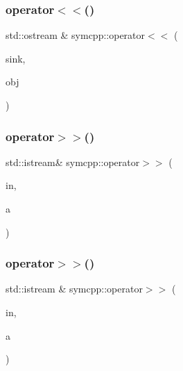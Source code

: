\mbox{\label{namespacesymcpp_a7ad455b0637c10962ac159edf36b2754}} 
\subsubsection{\texorpdfstring{operator$<$$<$()}{operator<<()}\hspace{0.1cm}{\footnotesize\ttfamily [2/2]}}
{\footnotesize\ttfamily std\+::ostream \& symcpp\+::operator$<$$<$ (\begin{DoxyParamCaption}\item[{std\+::ostream \&}]{sink,  }\item[{const \mbox{\hyperlink{classsymcpp_1_1SymbolicGraph}{Symbolic\+Graph}} \&}]{obj }\end{DoxyParamCaption})}

\mbox{\label{namespacesymcpp_a9fe2d34ad3d273d051795b9a25d3c8ce}} 
\subsubsection{\texorpdfstring{operator$>$$>$()}{operator>>()}\hspace{0.1cm}{\footnotesize\ttfamily [1/2]}}
{\footnotesize\ttfamily std\+::istream\& symcpp\+::operator$>$$>$ (\begin{DoxyParamCaption}\item[{std\+::istream \&}]{in,  }\item[{\mbox{\hyperlink{structsymcpp_1_1ComplexToken}{Complex\+Token}} \&}]{a }\end{DoxyParamCaption})}

\mbox{\label{namespacesymcpp_a6223fff1711cd0a60f4346e55c602da8}} 
\subsubsection{\texorpdfstring{operator$>$$>$()}{operator>>()}\hspace{0.1cm}{\footnotesize\ttfamily [2/2]}}
{\footnotesize\ttfamily std\+::istream \& symcpp\+::operator$>$$>$ (\begin{DoxyParamCaption}\item[{std\+::istream \&}]{in,  }\item[{\mbox{\hyperlink{classsymcpp_1_1SymbolicGraph}{Symbolic\+Graph}} \&}]{a }\end{DoxyParamCaption})}

